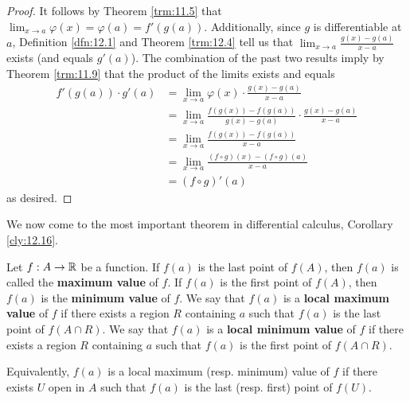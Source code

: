 \documentclass[../main.tex]{subfiles}
\begin{document}
\begin{theorem}
\begin{proof}
        It follows by Theorem \ref{trm:11.5} that $\lim_{x\to a}\varphi(x)=\varphi(a)=f'(g(a))$. Additionally, since $g$ is differentiable at $a$, Definition \ref{dfn:12.1} and Theorem \ref{trm:12.4} tell us that $\lim_{x\to a}\frac{g(x)-g(a)}{x-a}$ exists (and equals $g'(a)$). The combination of the past two results imply by Theorem \ref{trm:11.9} that the product of the limits exists and equals
        \begin{align*}
            f'(g(a))\cdot g'(a) &= \lim_{x\to a}\varphi(x)\cdot\frac{g(x)-g(a)}{x-a}\\
            &= \lim_{x\to a}\frac{f(g(x))-f(g(a))}{g(x)-g(a)}\cdot\frac{g(x)-g(a)}{x-a}\\
            &= \lim_{x\to a}\frac{f(g(x))-f(g(a))}{x-a}\\
            &= \lim_{x\to a}\frac{(f\circ g)(x)-(f\circ g)(a)}{x-a}\\
            &= (f\circ g)'(a)
        \end{align*}
        as desired.
    \end{proof}
\end{theorem}

We now come to the most important theorem in differential calculus, Corollary \ref{cly:12.16}.

\begin{definition}\label{dfn:12.11}
    Let $f:A\to\mathbb{R}$ be a function. If $f(a)$ is the last point of $f(A)$, then $f(a)$ is called the \textbf{maximum value} of $f$. If $f(a)$ is the first point of $f(A)$, then $f(a)$ is the \textbf{minimum value} of $f$. We say that $f(a)$ is a \textbf{local maximum value} of $f$ if there exists a region $R$ containing $a$ such that $f(a)$ is the last point of $f(A\cap R)$. We say that $f(a)$ is a \textbf{local minimum value} of $f$ if there exists a region $R$ containing $a$ such that $f(a)$ is the first point of $f(A\cap R)$.
\end{definition}

\begin{remark}\label{rmk:12.12}
    Equivalently, $f(a)$ is a local maximum (resp. minimum) value of $f$ if there exists $U$ open in $A$ such that $f(a)$ is the last (resp. first) point of $f(U)$.
\end{remark}
\end{document}
